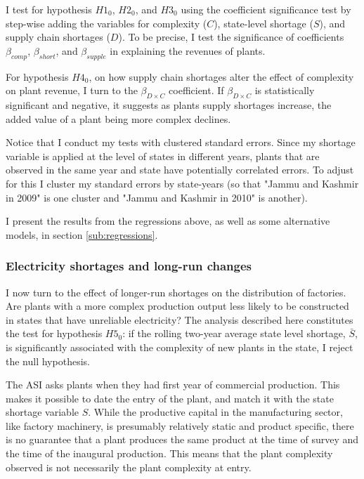 \documentclass[11pt]{article}
\begin{document}
I test for hypothesis $H1_0$, $H2_0$, and $H3_0$ using the coefficient significance test by step-wise adding the variables for complexity ($C$), state-level shortage ($S$), and supply chain shortages ($D$). To be precise, I test the significance of coefficients $\beta_{comp}$, $\beta_{short}$, and $\beta_{supple}$ in explaining the revenues of plants.

For hypothesis $H4_0$, on how supply chain shortages alter the effect of complexity on plant revenue, I turn to the $\beta_{D \times C}$ coefficient. If $\beta_{D \times C}$ is statistically significant and negative, it suggests as plants supply shortages increase, the added value of a plant being more complex declines.

Notice that I conduct my tests with clustered standard errors. Since my shortage variable is applied at the level of states in different years, plants that are observed in the same year and state have potentially correlated errors. To adjust for this I cluster my standard errors by state-years (so that "Jammu and Kashmir in 2009" is one cluster and "Jammu and Kashmir in 2010" is another).

I present the results from the regressions above, as well as some alternative models, in section \ref{sub:regressions}.

\subsubsection{Electricity shortages and long-run changes}\label{sub:entry_emp_strat}

I now turn to the effect of longer-run shortages on the distribution of factories. Are plants with a more complex production output less likely to be constructed in states that have unreliable electricity? The analysis described here constitutes the test for hypothesis $H5_0$: if the rolling two-year average state level shortage, $\bar{S}$, is significantly associated with the complexity of new plants in the state, I reject the null hypothesis. 

The ASI asks plants when they had first year of commercial production. This makes it possible to date the entry of the plant, and match it with the state shortage variable $S$. While the productive capital in the manufacturing sector, like factory machinery, is presumably relatively static and product specific, there is no guarantee that a plant produces the same product at the time of survey and the time of the inaugural production. This means that the plant complexity observed is not necessarily the plant complexity at entry. 
\end{document}
